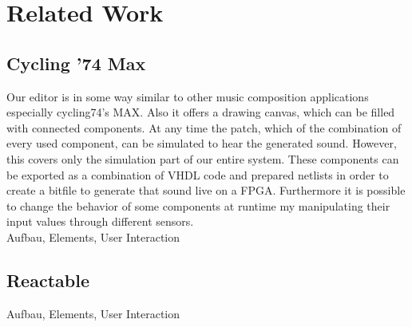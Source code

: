 \chapter{Related Work}
	 
\section{Cycling '74 Max}
	Our editor is in some way similar to other music composition applications especially cycling74's MAX. Also it offers a drawing canvas, which can be filled with connected components. At any time the patch, which of the combination of every used component, can be simulated to hear the generated sound. However, this covers only the simulation part of our entire system. These components can be exported as a combination of VHDL code and prepared netlists in order to create a bitfile to generate that sound live on a FPGA. Furthermore it is possible to change the behavior of some components at runtime my manipulating their input values through different sensors. \\
	Aufbau, Elements, User Interaction

\section{Reactable}

Aufbau, Elements, User Interaction
